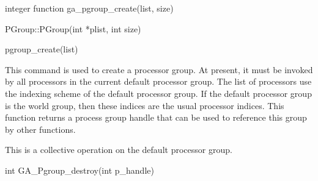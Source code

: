 \documentclass[12pt]{article}
\begin{document}
\begin{fapi}
\begin{fcode}
integer function ga_pgroup_create(list, size)
\end{fcode}
\begin{funcargs}
\end{funcargs}
\end{fapi}

\begin{cxxapi}
\begin{cxxcode}
PGroup::PGroup(int *plist, int size)
\end{cxxcode}
\begin{funcargs}
\end{funcargs}
\end{cxxapi}

\begin{pyapi}
\begin{pycode}
pgroup_create(list)
\end{pycode}
\begin{funcargs}
\end{funcargs}
\end{pyapi}

\dcoll

\begin{desc}

This command is used to create a processor group. At present, it must be
invoked by all processors in the current default processor group. The list of
processors use the indexing scheme of the default processor group. If the
default processor group is the world group, then these indices are the usual
processor indices. This function returns a process group handle that can be
used to reference this group by other functions.

This is a collective operation on the default processor group.

\end{desc}


\begin{capi}
\begin{ccode}
int GA_Pgroup_destroy(int p_handle)
\end{ccode}
\begin{funcargs}
\end{funcargs}
\end{capi}
\end{document}
